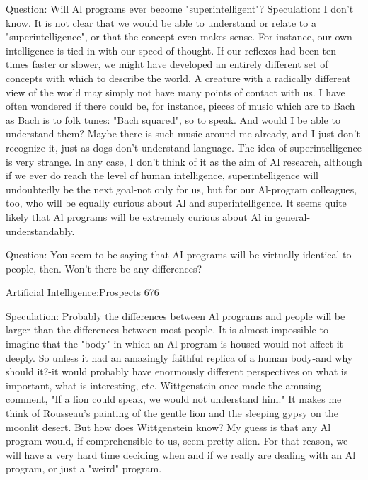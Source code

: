 Question: Will Al programs ever become "superintelligent"?
  Speculation: I don't know. It is not clear that we would be able to understand or relate
     to a "superintelligence", or that the concept even makes sense. For instance, our
     own intelligence is tied in with our speed of thought. If our reflexes had been ten
     times faster or slower, we might have developed an entirely different set of
     concepts with which to describe the world. A creature with a radically different
     view of the world may simply not have many points of contact with us. I have often
     wondered if there could be, for instance, pieces of music which are to Bach as Bach
     is to folk tunes: "Bach squared", so to speak. And would I be able to understand
     them? Maybe there is such music around me already, and I just don't recognize it,
     just as dogs don't understand language. The idea of superintelligence is very
     strange. In any case, I don't think of it as the aim of Al research, although if we ever
     do reach the level of human intelligence, superintelligence will undoubtedly be the
     next goal-not only for us, but for our Al-program colleagues, too, who will be
     equally curious about Al and superintelligence. It seems quite likely that Al
     programs will be extremely curious about Al in general-understandably.

Question: You seem to be saying that AI programs will be virtually identical to people,
  then. Won't there be any differences?




Artificial Intelligence:Prospects                                                        676

   Speculation: Probably the differences between Al programs and people will be larger
     than the differences between most people. It is almost impossible to imagine that
     the "body" in which an Al program is housed would not affect it deeply. So unless
     it had an amazingly faithful replica of a human body-and why should it?-it would
     probably have enormously different perspectives on what is important, what is
     interesting, etc. Wittgenstein once made the amusing comment, "If a lion could
     speak, we would not understand him." It makes me think of Rousseau's painting of
     the gentle lion and the sleeping gypsy on the moonlit desert. But how does
     Wittgenstein know? My guess is that any Al program would, if comprehensible to
     us, seem pretty alien. For that reason, we will have a very hard time deciding when
     and if we really are dealing with an Al program, or just a "weird" program.

